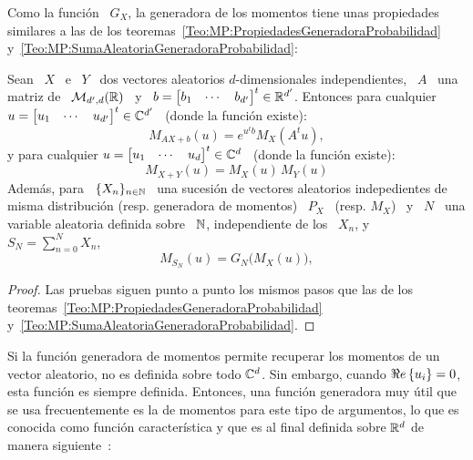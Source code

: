 Como la funci\'on \ $G_X$, la  generadora de los momentos tiene unas propiedades
similares  a las  de  los teoremas~\ref{Teo:MP:PropiedadesGeneradoraProbabilidad}
y~\ref{Teo:MP:SumaAleatoriaGeneradoraProbabilidad}:
%
\begin{teorema}%
\label{Teo:MP:PropiedadesGeneradoraMomentos}
%
  Sean  \   $X$  \  e  \   $Y$  \  dos   vectores  aleatorios  $d$-dimensionales
  independientes,  \ $A$  \ una  matriz de  \  $\mathcal{M}_{d',d}(\mathbb{R})$ \  y \  $b
  =   \begin{bmatrix}    b_1   &    \cdots   &   b_{d'}    \end{bmatrix}^t   \in
  \mathbb{R}^{d'}$.  Entonces para  cualquier $u  =  \begin{bmatrix} u_1  & \cdots  &
    u_{d'} \end{bmatrix}^t \in \mathbb{C}^{d'}$ \ (donde la funci\'on existe):
  \[
  M_{A X + b}(u) =  e^{u^t b} M_X\left( A^t u \right),
  \]
  y para cualquier  $u = \begin{bmatrix} u_1 & \cdots  & u_d \end{bmatrix}^t \in
  \mathbb{C}^d$ \ (donde la funci\'on existe):
  \[
  M_{X+Y}(u) = M_X(u) \, M_Y(u)
  \]
  Adem\'as,  para \  $\{ X_n  \}_{n \in  \mathbb{N}}$ \,  una sucesi\'on  de vectores
  aleatorios  indepedientes  de   misma  distribuci\'on  (resp.   generadora  de
  momentos) \ $P_X$ \ (resp. $M_X$) \  y \ $N$ \ una variable aleatoria definida
  sobre \ $\mathbb{N}$, independiente de los \ $X_n$, y \ $ S_N = \sum_{n=0}^N X_n$,
  \[
  M_{S_N}(u) =  G_N \big( M_X(u) \big),
  \]
\end{teorema}
%
\begin{proof}
  Las  pruebas  siguen   punto  a  punto  los  mismos  pasos   que  las  de  los
  teoremas~\ref{Teo:MP:PropiedadesGeneradoraProbabilidad}
  y~\ref{Teo:MP:SumaAleatoriaGeneradoraProbabilidad}.
\end{proof}



\label{Ssec:MP:FuncionCaracteristica}

Si  la funci\'on generadora  de momentos  permite recuperar  los momentos  de un
vector  aleatorio, no  es definida  sobre todo  $\mathbb{C}^d$.  Sin  embargo, cuando
$\Re e \left\{ u_i \right\} = 0$,  esta funci\'on es siempre definida.   Entonces, una funci\'on
generadora muy \'util que se usa frecuentemente es la de momentos para este tipo
de argumentos,  lo que es conocida  como funci\'on caracter\'istica y  que es al
final definida  sobre $\mathbb{R}^d$  de manera siguiente~\cite{Luk61,  Gol61, Fel68,
  SteWei71, JohKot97, Muk00, AshDol99, AthLah06, Sas13}:


